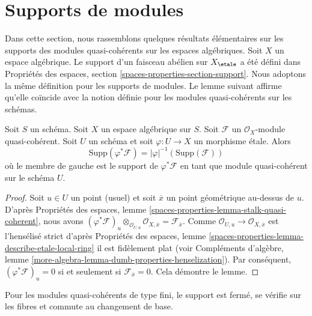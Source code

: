 \section{Supports de modules}
\label{section-support}

\noindent
Dans cette section, nous rassemblons quelques résultats élémentaires sur les
supports des modules quasi-cohérents sur les espaces algébriques. Soit $X$ un
espace algébrique. Le support d'un faisceau abélien sur $X_\etale$
a été défini dans Propriétés des espaces, section
\ref{spaces-properties-section-support}.
Nous adoptons la même définition pour les supports de modules.
Le lemme suivant affirme qu'elle coïncide avec la notion
définie pour les modules quasi-cohérents sur les schémas.

\begin{lemma}
\label{lemma-support-covering}
Soit $S$ un schéma. Soit $X$ un espace algébrique sur $S$.
Soit $\mathcal{F}$ un $\mathcal{O}_X$-module quasi-cohérent.
Soit $U$ un schéma et soit $\varphi : U \to X$ un morphisme étale.
Alors
$$
\text{Supp}(\varphi^*\mathcal{F}) = |\varphi|^{-1}(\text{Supp}(\mathcal{F}))
$$
où le membre de gauche est le support de $\varphi^*\mathcal{F}$ en tant que
module quasi-cohérent sur le schéma $U$.
\end{lemma}

\begin{proof}
Soit $u\in U$ un point (usuel) et soit $\overline{x}$ un
point géométrique au-dessus de $u$. D'après
Propriétés des espaces, lemme \ref{spaces-properties-lemma-stalk-quasi-coherent},
nous avons
$(\varphi^*\mathcal{F})_u \otimes_{\mathcal{O}_{U, u}}
\mathcal{O}_{X, \overline{x}} = \mathcal{F}_{\overline{x}}$.
Comme $\mathcal{O}_{U, u} \to \mathcal{O}_{X, \overline{x}}$
est l'hensélisé strict d'après
Propriétés des espaces, lemme
\ref{spaces-properties-lemma-describe-etale-local-ring}
il est fidèlement plat (voir
Compléments d'algèbre, lemme
\ref{more-algebra-lemma-dumb-properties-henselization}).
Par conséquent, $(\varphi^*\mathcal{F})_u = 0$ si et seulement si
$\mathcal{F}_{\overline{x}} = 0$. Cela démontre le lemme.
\end{proof}

\noindent
Pour les modules quasi-cohérents de type fini, le support est fermé,
se vérifie sur les fibres et commute au changement de base.


